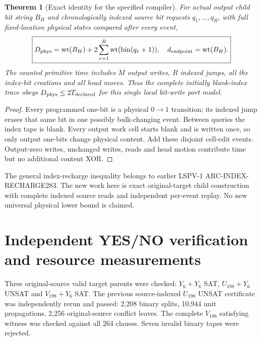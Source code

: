 \documentclass[11pt]{article}
\newtheorem{theorem}{Theorem}
\begin{document}
\begin{theorem}[Exact identity for the specified compiler]
For actual output child bit string $B_H$ and chronologically indexed source bit requests $q_1,\ldots,q_R$, with full fixed-location physical states compared after every event,
\[
 \boxed{D_{\rm phys}=\operatorname{wt}(B_H)+2\sum_{r=1}^{R}\operatorname{wt}(\mathrm{bin}(q_r+1)),
 \quad d_{\rm endpoint}=\operatorname{wt}(B_H).}
\]
The counted primitive time includes $M$ output writes, $R$ indexed jumps, all the index-bit creations and all head moves. Thus the complete initially blank-index trace obeys $D_{\rm phys}\le 2T_{\rm declared}$ for this single local bit-write port model.
\end{theorem}
\begin{proof}
Every programmed one-bit is a physical $0\to1$ transition; its indexed jump erases that same bit in one possibly bulk-changing event. Between queries the index tape is blank. Every output work cell starts blank and is written once, so only output one-bits change physical content. Add these disjoint cell-edit events. Output-zero writes, unchanged writes, reads and head motion contribute time but no additional content XOR.
\end{proof}
The general index-recharge inequality belongs to earlier LSPV-1 ARC-INDEX-RECHARGE283. The new work here is exact original-target child construction with complete indexed source reads and independent per-event replay. No new universal physical lower bound is claimed.

\section{Independent YES/NO verification and resource measurements}
Three original-source valid target parents were checked: $Y_6+Y_6$ SAT, $U_{198}+Y_6$ UNSAT and $V_{198}+Y_6$ SAT. The previous source-indexed $U_{198}$ UNSAT certificate was independently rerun and passed: 2,208 binary splits, 10,944 unit propagations, 2,256 original-source conflict leaves. The complete $V_{198}$ satisfying witness was checked against all 264 clauses. Seven invalid binary tapes were rejected.
\end{document}
